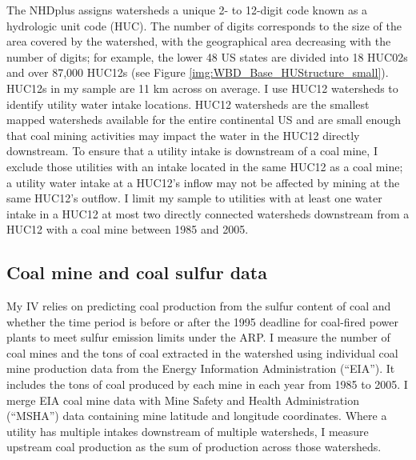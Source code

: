 \documentclass[12pt]{article}
\begin{document}
The NHDplus assigns watersheds a unique 2- to 12-digit code known as a hydrologic unit code (HUC). The number of digits corresponds to the size of the area covered by the watershed, with the geographical area decreasing with the number of digits; for example, the lower 48 US states are divided into 18 HUC02s and over 87,000 HUC12s (see Figure \ref{img:WBD_Base_HUStructure_small}). HUC12s in my sample are 11 km across on average. I use HUC12 watersheds to identify utility water intake locations. HUC12 watersheds are the smallest mapped watersheds available for the entire continental US and are small enough that coal mining activities may impact the water in the HUC12 directly downstream. To ensure that a utility intake is downstream of a coal mine, I exclude those utilities with an intake located in the same HUC12 as a coal mine; a utility water intake at a HUC12's inflow may not be affected by mining at the same HUC12's outflow. I limit my sample to utilities with at least one water intake in a HUC12 at most two directly connected watersheds downstream from a HUC12 with a coal mine between 1985 and 2005.

\subsection{Coal mine and coal sulfur data}

My IV relies on predicting coal production from the sulfur content of coal and whether the time period is before or after the 1995 deadline for coal-fired power plants to meet sulfur emission limits under the ARP. I measure the number of coal mines and the tons of coal extracted in the watershed using individual coal mine production data from the Energy Information Administration (``EIA''). It includes the tons of coal produced by each mine in each year from 1985 to 2005. I merge EIA coal mine data with Mine Safety and Health Administration (``MSHA'') data containing mine latitude and longitude coordinates. Where a utility has multiple intakes downstream of multiple watersheds, I measure upstream coal production as the sum of production across those watersheds. 
\end{document}
